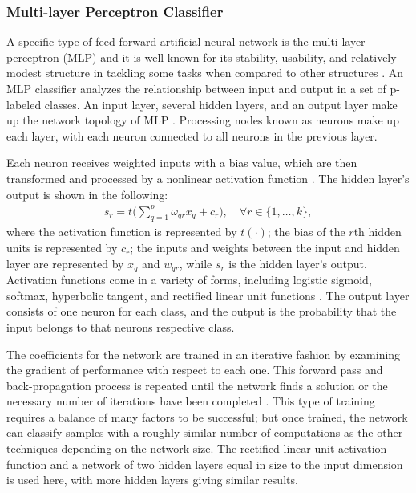 \subsubsection{Multi-layer Perceptron Classifier}
A specific type of feed-forward artificial neural network is the multi-layer perceptron (MLP)
and it is well-known for its stability, usability, and relatively modest structure 
in tackling some tasks when compared to other structures \cite{yulita2018multi}. 
An MLP classifier analyzes the relationship between input and output 
in a set of p-labeled classes. An input layer, several hidden layers, and an output layer 
make up the network topology of MLP \cite{molina2021classification}. 
Processing nodes known as neurons make up each layer, 
with each neuron connected to all neurons in the previous layer. 

Each neuron receives weighted inputs with a bias value, which are then 
transformed and processed by a nonlinear activation function \cite{montesinos2022fundamentals}. 
The hidden layer's output is shown in the following:
\begin{align}
s_r = t \bigg( \sum_{q=1}^p \omega_{qr} x_q + c_r \bigg), \quad \forall r \in \{1, \ldots, k\},
\label{eq:layer}
\end{align}
where the activation function is represented by $t(\cdot)$; 
the bias of the $r$th hidden units is represented by $c_r$; 
the inputs and weights between the input and hidden layer are represented 
by $x_q$ and $w_{qr}$, while $s_r$ is the hidden layer's output. 
Activation functions come in a variety of forms, including logistic sigmoid, softmax, 
hyperbolic tangent, and rectified linear unit functions \cite{sharma2017activation}. 
The output layer consists of one neuron for each class, and the output is the
probability that the input belongs to that neurons respective class.

The coefficients for the network are trained in an iterative fashion by examining 
the gradient of performance with respect to each one.
This forward pass and back-propagation process is repeated until the network finds 
a solution or the necessary number of iterations have been completed \cite{maxwell2017deep}.
This type of training requires a balance of many factors to be successful; but once trained,
the network can classify samples with a roughly similar number of computations as the other
techniques depending on the network size.
The rectified linear unit activation function and a network of two hidden layers 
equal in size to the input dimension is used here, with more hidden layers giving similar results.

